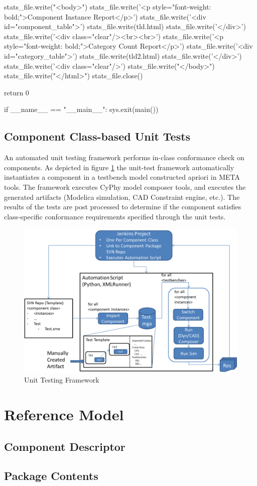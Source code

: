 \begin{MyVerbatim}
    stats_file.write("<body>")
    stats_file.write('<p style="font-weight: bold;">Component Instance 
     Report</p>')
    stats_file.write('<div id="component_table">')
    stats_file.write(tld.html)
    stats_file.write('</div>')
    stats_file.write('<div class="clear"/><br><br>')
    stats_file.write('<p style="font-weight: bold;">Category Count 
     Report</p>')
    stats_file.write('<div id="category_table">')
    stats_file.write(tld2.html)
    stats_file.write('</div>')
    stats_file.write('<div class="clear"/>')
    stats_file.write("</body>")
    stats_file.write("</html>")
    stats_file.close()

    return 0

if __name__ == "__main__":
    sys.exit(main())    
\end{MyVerbatim}

\section{Component Class-based Unit Tests}
An automated unit testing framework performs in-class conformance check on components. As depicted in figure \ref{Unit_test_framework} the unit-test framework automatically instantiates a component in a testbench model constructed apriori in META tools. The framework executes CyPhy model composer tools, and executes the generated artifacts (Modelica simulation,  CAD Constraint engine, etc.). The results of the tests are post processed to determine if the component satisfies class-specific conformance requirements specified through the unit tests. 

\begin{figure}
\includegraphics*[width=\textwidth]{Unit_test_framework}
\caption{Unit Testing Framework}
\label{Unit_test_framework}
\end{figure}


\chapter{Reference Model}
\section{Component Descriptor}
\section{Package Contents}

